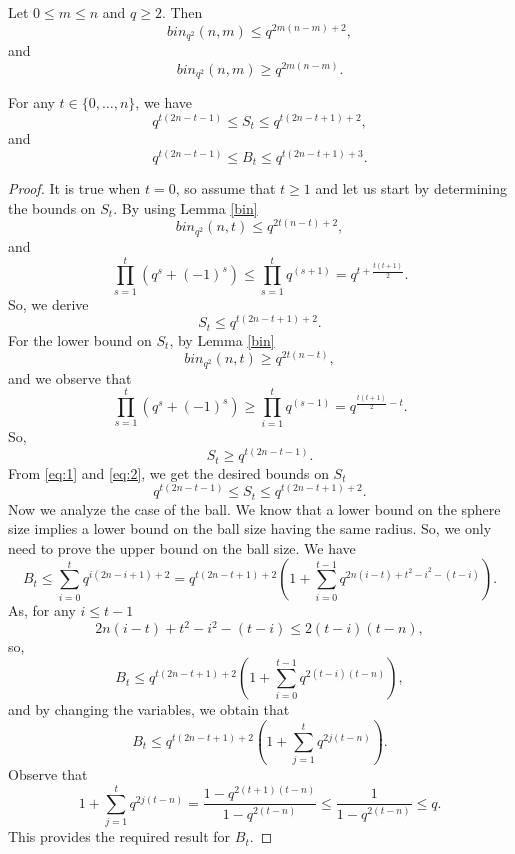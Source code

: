 \documentclass[10pt,a4paper]{amsart}
\begin{document}
\begin{lemma}\label{bin}
 Let $0\leq m\leq n$ and $q\geq2$.
 Then
 \[bin_{q^2}(n,m)\leq q^{2m(n-m)+2},\]
 and 
 \[bin_{q^2}(n,m)\geq q^{2m(n-m)}. \]
\end{lemma}

\begin{proposition}\label{prop: Boundsize}
For any $t\in\{0,\ldots,n\}$, we have
\[q^{t(2n-t-1)}\leq S_t\leq q^{t(2n-t+1)+2},\]
and
\[q^{t(2n-t-1)}\leq B_t\leq q^{t(2n-t+1)+3}.\]
\end{proposition}

\begin{proof}
    It is true when $t=0$, so assume that $t\geq1$ and let us start by determining the bounds on $S_t$. By using Lemma \ref{bin}
    \[bin_{q^{2}}(n,t)\leq q^{2t(n-t)+2},\]
    and
    \[\prod_{s=1}^{t}(q^{s}+(-1)^{s})\leq\prod_{s=1}^{t}q^{(s+1)}=q^{t+\frac{t(t+1)}{2}}.\]
    So, we derive
    \begin{equation}\label{eq:1}
       S_t\leq q^{t(2n-t+1)+2}.
    \end{equation}
    For the lower bound on $S_t$, by Lemma \ref{bin}
    \[bin_{q^2}(n,t)\geq q^{2t(n-t)},\]
    and we observe that 
    \[\prod_{s=1}^{t}(q^{s}+(-1)^{s})\geq\prod_{i=1}^{t}q^{(s-1)}=q^{\frac{t(t+1)}{2}-t}.\]
    So,
    \begin{equation}\label{eq:2}
    S_t\geq q^{t(2n-t-1)}. 
    \end{equation}
      From \eqref{eq:1} and \eqref{eq:2}, we get the desired bounds on $S_t$
     \[q^{t(2n-t-1)}\leq S_t\leq q^{t(2n-t+1)+2}.\]
     Now we analyze the case of the ball. We know that a lower bound on the sphere size implies a lower bound on the ball size having the same radius. So, we only need to prove the upper bound on the ball size. We have
 \[ B_t\leq \sum _{i=0}^{t}q^{i(2n-i+1)+2} =q^{t(2n-t+1)+2}\left( 1+\sum _{i=0}^{t-1}q^{2n(i-t)+t^2-i^2-(t-i)} \right).\]
 As, for any $i\leq t-1$  \[ 2n(i-t)+t^2-i^2-(t-i)\leq 2(t-i)(t-n),\]
 so, 
 \[B_t\leq q^{t(2n-t+1)+2}\left( 1+\sum _{i=0}^{t-1} q^{2(t-i)(t-n)}\right),\]
and by changing the variables, we obtain that
        \[ B_t\leq q^{t(2n-t+1)+2}(1+\sum _{j=1}^{t}q^{2j(t-n)}).\]
     Observe that
     \[1+\sum _{j=1}^{t}q^{2j(t-n)}=\frac{1-q^{2(t+1)(t-n)}}{1-q^{2(t-n)}}\leq \frac{1}{1-q^{2(t-n)}}\leq q.\]
     This provides the required result for $B_t$. 
\end{proof} 
\end{document}
